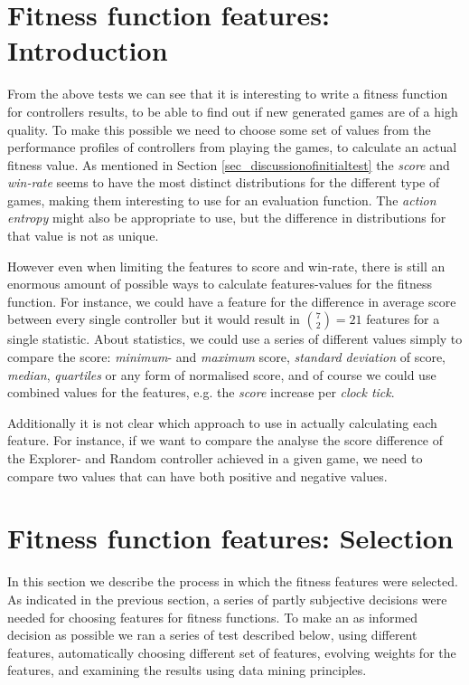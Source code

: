 \documentclass[a4paper,titlepage,final]{report}
\begin{document}
\section{Fitness function features: Introduction}
From the above tests we can see that it is interesting to write a fitness function for controllers results, to be able to find out if new generated games are of a high quality.
To make this possible we need to choose some set of values from the performance profiles of controllers from playing the games, to calculate an actual fitness value.
As mentioned in Section \ref{sec_discussionofinitialtest} the \textit{score} and \textit{win-rate} seems to have the most distinct distributions for the different type of games, making them interesting to use for an evaluation function.
The \textit{action entropy} might also be appropriate to use, but the difference in distributions for that value is not as unique.

However even when limiting the features to score and win-rate, there is still an enormous amount of possible ways to calculate features-values for the fitness function.
For instance, we could have a feature for the difference in average score between every single controller but it would result in $\binom{7}{2}=21$ features for a single statistic.
About statistics, we could use a series of different values simply to compare the score: \textit{minimum}- and \textit{maximum} score, \textit{standard deviation} of score, \textit{median}, \textit{quartiles} or any form of normalised score, and of course we could  use combined values for the features, e.g. the \textit{score} increase per \textit{clock tick}.

Additionally it is not clear which approach to use in actually calculating each feature. 
For instance, if we want to compare the analyse the score difference of the Explorer- and Random controller achieved in a given game, we need to compare two values that can have both positive and negative values.



\section{Fitness function features: Selection}
In this section we describe the process in which the fitness features were selected.
As indicated in the previous section, a series of partly subjective decisions were needed for  choosing features for fitness functions.
To make an as informed decision as possible we ran a series of test described below, using different features, automatically choosing different set of features, evolving weights for the features, and examining the results using data mining principles.
\end{document}

